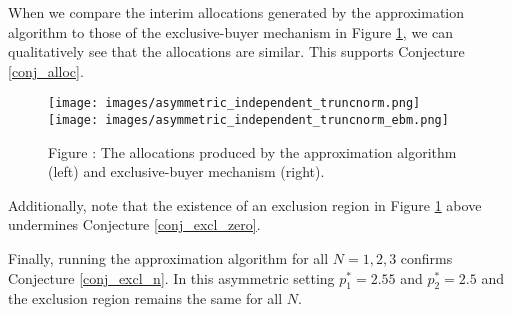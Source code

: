 When we compare the interim allocations generated by the approximation algorithm to those of the exclusive-buyer mechanism in Figure \ref{fig:truncnorm_alloc}, we can qualitatively see that the allocations are similar. This supports Conjecture \ref{conj_alloc}.

\begin{figure}[H]
    \begin{center}
    \texttt{[image: images/asymmetric\_independent\_truncnorm.png]}
    \texttt{[image: images/asymmetric\_independent\_truncnorm\_ebm.png]}
    \end{center}
    
    \vspace{1mm}
    \raggedright{\small {\sc Figure \thefig\label{fig:truncnorm_alloc}:} The allocations produced by the approximation algorithm (left) and exclusive-buyer mechanism (right).} 
\end{figure}

\noindent Additionally, note that the existence of an exclusion region in Figure \ref{fig:truncnorm_alloc} above undermines Conjecture \ref{conj_excl_zero}.

Finally, running the approximation algorithm for all $N=1,2,3$ confirms Conjecture \ref{conj_excl_n}. In this asymmetric setting $p_1^* = 2.55$ and $p_2^* = 2.5$ and the exclusion region remains the same for all $N$. 





  
